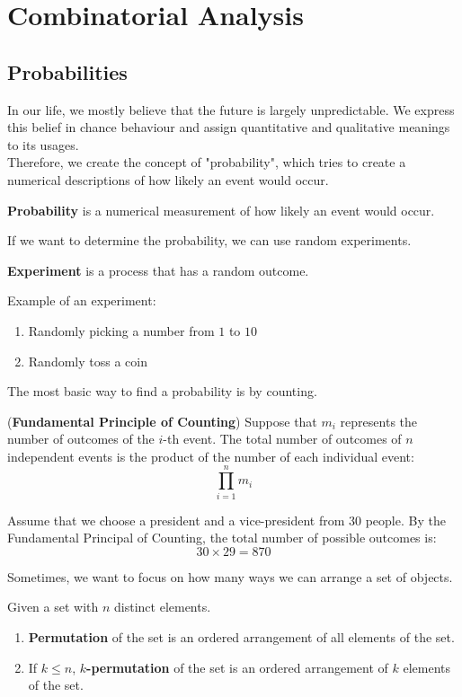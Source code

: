 \documentclass{huhtakm-template-book}
\begin{document}
\chapter{Combinatorial Analysis}
\section{Probabilities}
In our life, we mostly believe that the future is largely unpredictable. We express this belief in chance behaviour and assign quantitative and qualitative meanings to its usages.\\
Therefore, we create the concept of "probability", which tries to create a numerical descriptions of how likely an event would occur.
\begin{defn}
	\textbf{Probability} is a numerical measurement of how likely an event would occur.
\end{defn}
If we want to determine the probability, we can use random experiments.
\begin{defn}
	\textbf{Experiment} is a process that has a random outcome.
\end{defn}
\begin{eg}
	Example of an experiment:
	\begin{enumerate}
		\item Randomly picking a number from $1$ to $10$
		\item Randomly toss a coin
	\end{enumerate}
\end{eg}
The most basic way to find a probability is by counting.
\begin{thm}(\textbf{Fundamental Principle of Counting})
	Suppose that $m_{i}$ represents the number of outcomes of the $i$-th event. The total number of outcomes of $n$ independent events is the product of the number of each individual event:
	\begin{equation*}
		\prod_{i=1}^{n}m_{i}
	\end{equation*} 
\end{thm}
\begin{eg}
	Assume that we choose a president and a vice-president from $30$ people. By the Fundamental Principal of Counting, the total number of possible outcomes is:
	\begin{equation*}
		30\times 29=870
	\end{equation*}
\end{eg}
Sometimes, we want to focus on how many ways we can arrange a set of objects.
\begin{defn}
	Given a set with $n$ distinct elements.
	\begin{enumerate}
		\item \textbf{Permutation} of the set is an ordered arrangement of all elements of the set.
		\item If $k\leq n$, \textbf{$k$-permutation} of the set is an ordered arrangement of $k$ elements of the set.
	\end{enumerate}
\end{defn}
\end{document}
